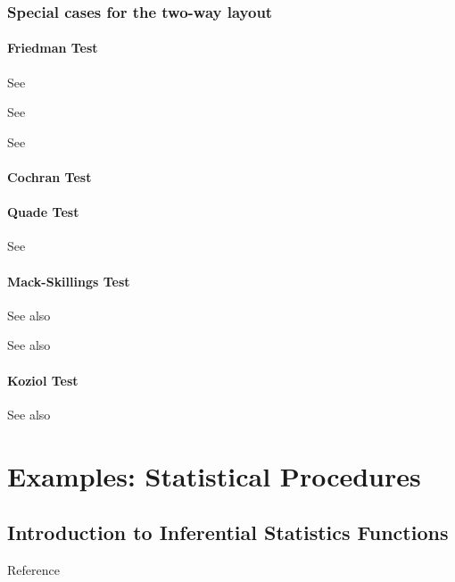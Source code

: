 \subsection{Special cases for the two-way layout}
\subsubsection{Friedman Test}
See \cite{Skillings_1981}

See \cite{Roehmel_1997}

See \cite{Gansky_2001}

\subsubsection{Cochran Test}

\subsubsection{Quade Test}

See \cite{Quade_1979}

\subsubsection{Mack-Skillings Test}

See also \cite{Mack_1980}


See also \cite{Skillings_1981}


\subsubsection{Koziol Test}

See also \cite{Koziol1982}









\chapter{Examples: Statistical Procedures}



\section{Introduction to Inferential Statistics Functions}

Reference \cite{bortz_distribution_1990}

